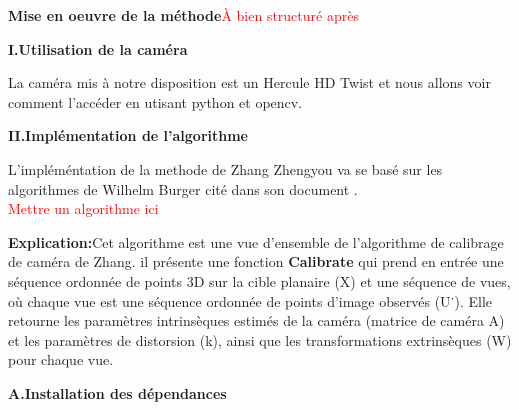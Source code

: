 \documentclass[12pt,a4paper]{report}
\begin{document}
\begin{center}
	\textbf{Mise en oeuvre de la méthode}\textcolor{red}{À bien structuré après}
\end{center}
	
	
\begin{center}
	\textbf{I.Utilisation de la caméra}
\end{center}

La caméra mis à notre disposition est un Hercule HD Twist et nous allons voir comment l'accéder en utisant python et opencv.


\begin{center}
	\textbf{II.Implémentation de l'algorithme}
\end{center}

L'impléméntation de la methode de Zhang Zhengyou va se basé sur les algorithmes de Wilhelm Burger cité dans son document \cite{burger_zhangs_2016} .\\

\textcolor{red}{Mettre un algorithme ici \\}

\textbf{Explication:}Cet algorithme est une vue d'ensemble de l'algorithme de calibrage de caméra de Zhang. il présente une fonction \textbf{Calibrate} qui prend en entrée une séquence ordonnée de points 3D sur la cible planaire (X) et une séquence de vues, où chaque vue est une séquence ordonnée de points d'image observés (U˙). Elle retourne les paramètres intrinsèques estimés de la caméra (matrice de caméra A) et les paramètres de distorsion (k), ainsi que les transformations extrinsèques (W) pour chaque vue. 










































\newpage

\begin{center}
	\textbf{A.Installation des dépendances}
\end{center}
\end{document}
